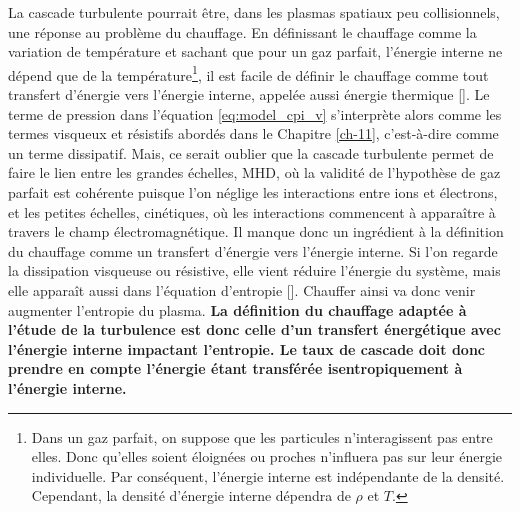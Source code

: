La cascade turbulente pourrait être, dans les plasmas spatiaux peu collisionnels, une réponse au problème du chauffage. En définissant le chauffage comme la variation de température et sachant que pour un gaz parfait, l'énergie interne ne dépend que de la température\footnote{Dans un gaz parfait, on suppose que les particules n'interagissent pas entre elles. Donc qu'elles soient éloignées ou proches n'influera pas sur leur énergie individuelle. Par conséquent, l'énergie interne est indépendante de la densité. Cependant, la densité d'énergie interne dépendra de $\rho$ et $T$.}, il est facile de définir le chauffage comme tout transfert d'énergie vers l'énergie interne, appelée aussi énergie thermique [\cite{cassak_pressure-strain_2022}]. Le terme de pression dans l'équation \eqref{eq:model_cpi_v} s'interprète alors comme les termes visqueux et résistifs abordés dans le Chapitre \ref{ch-11}, c'est-à-dire comme un terme \og dissipatif\fg{}. Mais, ce serait oublier que la cascade turbulente permet de faire le lien entre les grandes échelles, \acs{MHD}, où la validité de l'hypothèse de gaz parfait est cohérente puisque l'on néglige les interactions entre ions et électrons, et les petites échelles, cinétiques, où les interactions commencent à apparaître à travers le champ électromagnétique. Il manque donc un ingrédient à la définition du chauffage comme un transfert d'énergie vers l'énergie interne. Si l'on regarde la dissipation visqueuse ou résistive, elle vient réduire l'énergie du système, mais elle apparaît aussi dans l'équation d'entropie [\cite{eyink_cascades_2018}]. Chauffer ainsi va donc venir augmenter l'entropie du plasma. {\bf La définition du chauffage adaptée à l'étude de la turbulence est donc celle d'un transfert énergétique avec l'énergie interne impactant l'entropie. Le taux de cascade doit donc prendre en compte l'énergie étant transférée isentropiquement à l'énergie interne.}

